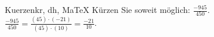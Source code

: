 \begin{MAufgabe}{Kuerzen}{kr, dh, MaTeX}
K\"urzen Sie soweit m\"oglich: $\frac{-945}{450}$.\\ 
\ifLsg\MLoesung
\quad $\frac{-945}{450}=\frac{(45)\cdot(-21)}{(45)\cdot(10)}=\frac{-21}{10}$.\else\relax\fi
 \end{MAufgabe}
